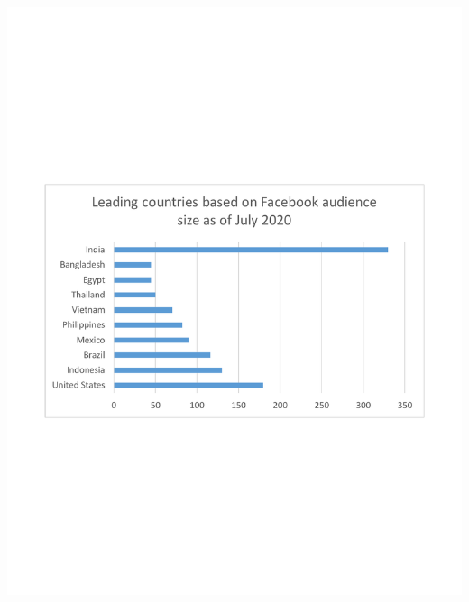\documentclass[10pt,twoside,slovak,a4paper]{article}
\begin{document}
\includegraphics[scale=0.5]{excel/excel.pdf}



\end{document}
